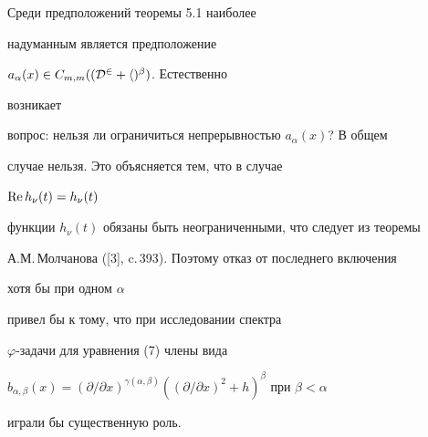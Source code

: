 \begin{notes} 


Среди предположений теоремы 5.1 наиболее 


надуманным является предположение 


$a_\alpha(x)\in C_{m,m}((\cal D^2+h)^\beta)$. Естественно 


возникает 


вопрос: нельзя ли ограничиться непрерывностью $a_\alpha(x)$? В общем  


случае нельзя. Это объясняется тем, что в случае 


$\operatorname{Re} h_\nu(t)=h_\nu(t)$ 


функции $h_\nu(t)$ обязаны быть неограниченными, что следует из теоремы 


А.М.\,Молчанова ([3], c.\,393). Поэтому отказ от последнего включения 


хотя бы при одном $\alpha$ 


привел бы к тому, что при исследовании спектра 


$\varphi$-задачи для уравнения (7) члены вида 


$b_{\alpha,\beta}(x)=(\partial/\partial x)^{\gamma(\alpha,\beta)} 


((\partial/\partial x)^2+h)^\beta$ при $\beta<\alpha$ 


играли бы существенную роль. 


\end{notes} 


 


